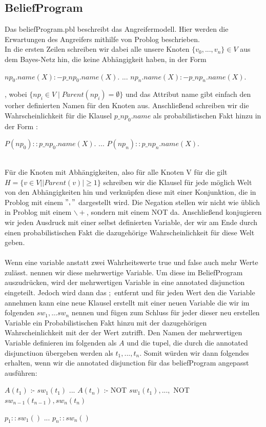 \documentclass[german,version-2020-11]{uzl-thesis}
\begin{document}
\subsection{BeliefProgram}
Das beliefProgram.pbl beschreibt das Angreifermodell. Hier werden die Erwartungen des Angreifers mithilfe von Problog beschrieben. \\ 
In die ersten Zeilen schreiben wir dabei alle unsere Knoten $\{v_0,...,v_n\} \in V$ aus dem Bayes-Netz hin, die keine Abhängigkeit haben, in der Form
\begin{Pseudocode}
$np_0.name(X) :- p\_np_0.name(X).$ 
...
$np_n.name(X) :- p\_np_n.name(X).$ 
\end{Pseudocode}
, wobei $\{np_i \in V \mid Parent(np_i) = \emptyset\}$ und das Attribut name gibt einfach den vorher definierten Namen für den Knoten aus. Anschließend schreiben wir die Wahrscheinlichkeit für die Klausel $p\_np_0.name$ als probabilistischen Fakt hinzu in der Form :
\begin{Pseudocode}
$P(np_0) ::  p\_np_0.name(X).$ 
...
$P(np_n) ::  p\_np_n.name(X).$ 
\end{Pseudocode} $ $\\
Für die Knoten mit Abhängigkeiten, also für alle Knoten V für die gilt $H=\{v \in V | \vert Parent(v) \vert \geq 1 \}$ schreiben wir die Klausel für jede möglich Welt von den Abhängigkeiten hin und verknüpfen diese mit einer Konjunktion, die in Problog mit einem $","$ dargestellt wird. Die Negation stellen wir nicht wie üblich in Problog mit einem $\backslash +$, sondern mit einem NOT da. Anschließend konjugieren wir jeden Ausdruck mit einer selbst definierten Variable, der wir am Ende durch einen probabilistischen Fakt die dazugehörige Wahrscheinlichkeit für diese Welt geben. \\ \\
Wenn eine variable anstatt zwei Wahrheitswerte true und false auch mehr Werte zulässt. nennen wir diese mehrwertige Variable.
Um diese im BeliefProgram auszudrücken, wird der mehrwertigen Variable in eine annotated disjunction eingeteilt. Jedoch wird dann das $;$ entfernt und für jeden Wert den die Variable annehmen kann eine neue Klausel erstellt mit einer neuen Variable die wir im folgenden $sw_1, ... sw_n$ nennen und fügen zum Schluss für jeder dieser neu erstellen Variable ein Probabilistischen Fakt hinzu mit der dazugehörigen Wahrscheinlichkeit mit der der Wert zutrifft.
Den Namen der mehrwertigen Variable definieren im folgenden als $A$ und die tupel, die durch die annotated disjunctiuon übergeben werden als $t_1 ,..., t_n$. Somit würden wir dann folgendes erhalten, wenn wir die annotated disjunction für das beliefProgram angepasst ausführen:
\begin{Pseudocode}
$A(t_1)$ :- $sw_1(t_1)$
...
$A(t_n)$ :- NOT $sw_1(t_1), ... ,$ NOT $sw_{n−1}(t_{n−1}), sw_n(t_n)$

$p_1::sw_1( )$
...
$p_n::sw_n( )$

\end{Pseudocode}
\end{document}
